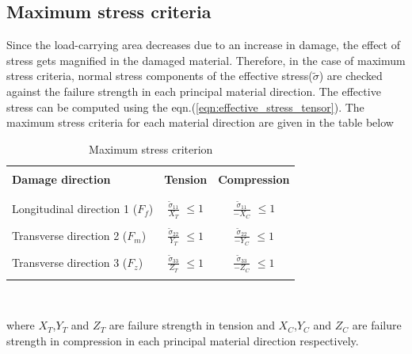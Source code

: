 \documentclass[12pt]{report}
\begin{document}
\subsection{Maximum stress criteria}\label{Maximum stress criteria}
\indent\indent\indent  Since the load-carrying area decreases due to an increase in damage, the effect of stress gets magnified in the damaged material. Therefore, in the case of maximum stress criteria, normal stress components of the effective stress($\tilde{\sigma}$) are checked against the failure strength in each principal material direction. The effective stress can be computed using the eqn.(\ref{eqn:effective_stress_tensor}). The maximum stress criteria for each material direction are given in the table below\\
\begin{table}[htbp]
  \begin{center}
     \begin{tabular}{l  c  c} 
     \hline
     \\
      \textbf{Damage direction} \;\;& \textbf{Tension} \;& \textbf{Compression}\\
      \\
      \hline
      \\
      Longitudinal direction 1 ($F_{f}$) & \Large{$\frac{\tilde{\sigma}_{11}}{X_{T}} $}\small{ $\leq 1$} & \Large{$\frac{\tilde{\sigma}_{11}}{-X_{C}} $}\small{ $\leq 1$} \\
      \\
      Transverse direction 2 ($F_{m}$)  &  \Large{$\frac{\tilde{\sigma}_{22}}{Y_{T}} $}\small{ $\leq 1$}  & \Large{$\frac{\tilde{\sigma}_{22}}{-Y_{C}} $}\small{ $\leq 1$}\\
      \\
      Transverse direction 3 ($F_{z}$) &  \Large{$\frac{\tilde{\sigma}_{33}}{Z_{T}} $}\small{ $\leq 1$}  &   \Large{$\frac{\tilde{\sigma}_{33}}{-Z_{C}} $}\small{ $\leq 1$}\\
       \\
       \hline
    \end{tabular}
    \\
    \caption{Maximum stress criterion}
    \label{tab:Maximum stress criterion}
  \end{center}
\end{table}
\FloatBarrier
where $X_{T}$,$ Y_{T} $ and $Z_{T}$ are failure strength in tension and $X_{C}$,$ Y_{C} $ and $Z_{C}$ are failure strength in compression in each principal material direction respectively.\\
\\
\end{document}
